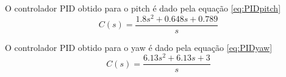 O controlador PID obtido para o pitch é dado pela equação \eqref{eq:PIDpitch}
\begin{equation}\label{eq:PIDpitch}
    C(s) = \frac{1.8 s^2 + 0.648 s + 0.789}{s}
\end{equation}


O controlador PID obtido para o yaw é dado pela equação \eqref{eq:PIDyaw}
\begin{equation}\label{eq:PIDyaw}
    C(s) = \frac{6.13 s^2 + 6.13 s + 3}{s}
\end{equation}